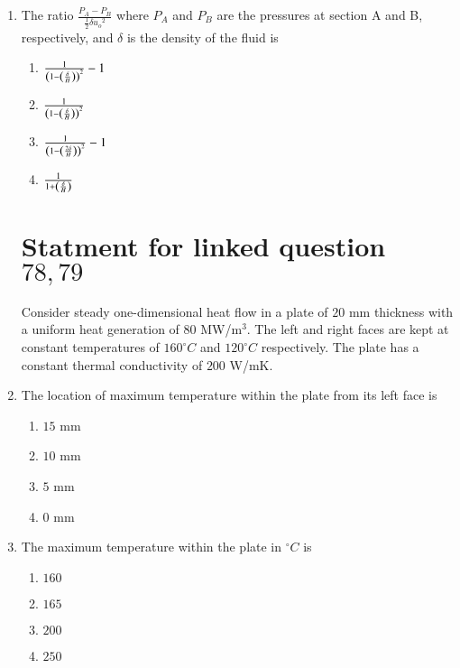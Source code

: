 \documentclass[journal,12pt,twocolumn]{IEEEtran}
\theoremstyle{remark}
\begin{document}
\begin{enumerate}[start=69]
                            \item The ratio $\frac{P_A - P_B}{\frac{1}{2}\delta{u_o}^2}$ where $P_A$ and $P_B$ are the pressures at section A and B, respectively, and $\delta$ is the density of the fluid is
                            \begin{enumerate}
                                \item $ \frac{1}{\left(1-\left(\frac{\delta}{H}\right)\right)^2} -1$
                                \item $ \frac{1}{\left(1-\left(\frac{\delta}{H}\right)\right)^2}$
                                \item $ \frac{1}{\left(1-\left(\frac{2\delta}{H}\right)\right)^2} -1$
                                \item $ \frac{1}{1+\left(\frac{\delta}{H}\right)}$
                            \end{enumerate}
                        \section{Statment for linked question $78 ,79$}
                        Consider steady one-dimensional heat flow in a plate of $20$ mm thickness with a uniform heat generation of $80$ MW/m$^3$. The left and right faces are kept at constant temperatures of $160^\circ C$ and $120^\circ C$ respectively. The plate has a constant thermal conductivity of $200$ W/mK. 
                        
                        \item The location of maximum temperature within the plate from its left face is
                        \begin{enumerate}
                            \item $15$ mm
                            \item $10$ mm
                            \item $5$ mm
                            \item $0$ mm
                        \end{enumerate}
                            \item The maximum temperature within the plate in $^\circ C$ is
                            \begin{enumerate}
                                \item $160$
                                \item $165$
                                \item $200$
                                \item $250$
                            \end{enumerate}

\end{enumerate}
\end{document}
